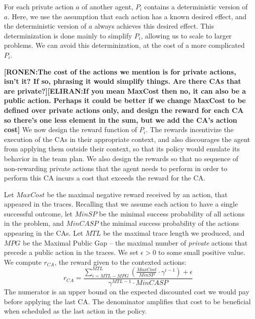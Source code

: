 \documentclass[letterpaper]{article} %
\theoremstyle{definition}
\newcommand{\eliran}[1]{\textbf{[\color{red}ELIRAN:#1]}}
\newcommand{\ronen}[1]{\textbf{[\color{blue}RONEN:#1]}}
\begin{document}
For each private action $a$ of another agent, $P_i$ contains a deterministic version of $a$. Here, we use the assumption that each action has a known desired effect, and the deterministic version of $a$ always achieves this desired effect. This determinization is done mainly to simplify $P_i$, allowing us to scale to larger problems. We can avoid this determinization, at the cost of a more complicated $P_i$.

\ronen{The cost of the actions we mention is for private actions, isn't it? If so, phrasing it would simplify things. Are there CAs that are private?}\eliran{If you mean MaxCost then no, it can also be a public action. Perhaps it could be better if we change MaxCost to be defined over private actions only, and design the reward for each CA so there's one less element in the sum, but we add the CA's action cost}
We now design the reward function of $P_i$. The rewards incentivize the execution of the CAs in their appropriate context, and also discourages the agent from applying them outside their context, so that its policy would emulate its behavior in the team plan. 
We also design the rewards so that no sequence of non-rewarding private actions that the agent needs to perform in order to perform this CA incurs a cost that exceeds the reward for the CA.



Let $MaxCost$ be the maximal negative reward received by an action, that appeared in the traces.
Recalling that we assume each action to have a single successful outcome, let $MinSP$ be the minimal success probability of all actions in the problem, and $MinCASP$ the minimal success probability of the actions appearing in the CAs. Let $MTL$ be the maximal trace length we produced, and $MPG$ be the Maximal Public Gap -- the maximal number of \emph{private} actions that precede a public action in the traces. We set $\epsilon > 0$ to some small  positive value. We compute $r_{CA}$, the reward given to the contexted actions:
\begin{equation}
\label{eqn:rq}
   r_{CA}= \frac{\sum_{i=MTL - MPG}^{MTL}(\frac{MaxCost}{MinSP} \cdot \gamma^{i-1})+ \epsilon}{\gamma^{MTL-1}\cdot MinCASP} 
\end{equation}%
The numerator is an upper bound on the expected discounted cost we would pay before applying the last CA. The denominator amplifies that cost to be beneficial when scheduled as the last action in the policy.
\end{document}
